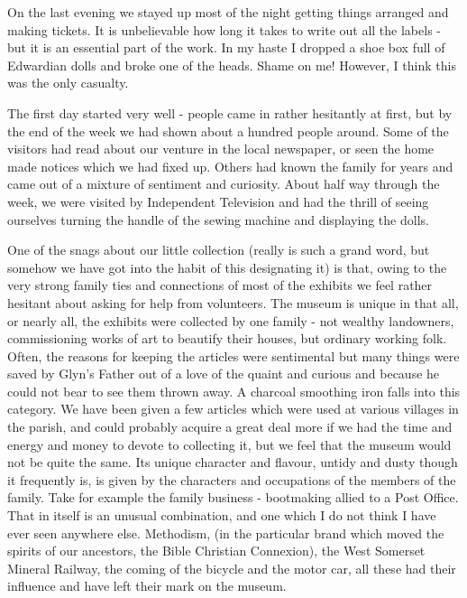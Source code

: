 On the last evening we stayed up most of the night getting things arranged and making tickets. It is unbelievable how long it takes to write out all the labels - but it is an essential part of the work. In my haste I dropped a shoe box full of Edwardian dolls and broke one of the heads. Shame on me! However, I think this was the only casualty.

The first day started very well - people came in rather hesitantly at first, but by the end of the week we had shown about a hundred people around. Some of the visitors had read about our venture in the local newspaper, or seen the home made notices which we had fixed up. Others had known the family for years and came out of a mixture of sentiment and curiosity. About half way through the week, we were visited by Independent Television and had the thrill of seeing ourselves turning the handle of the sewing machine and displaying the dolls.

One of the snags about our little collection (really  is such a grand word, but somehow we have got into the habit of this designating it) is that, owing to the very strong family ties and connections of most of the exhibits we feel rather hesitant about asking for help from volunteers. The museum is unique in that all, or nearly all, the exhibits were collected by one family - not wealthy landowners, commissioning works of art to beautify their houses, but ordinary working folk. Often, the reasons for keeping the articles were sentimental but many things were saved by Glyn's Father out of a love of the quaint and curious and because he could not bear to see them thrown away. A charcoal smoothing iron falls into this category. We have been given a few articles which were used at various villages in the parish, and could probably acquire a great deal more if we had the time and energy and money to devote to collecting it, but we feel that the museum would not be quite the same. Its unique character and flavour, untidy and dusty though it frequently is, is given by the characters and occupations of the members of the family. Take for example the family business - bootmaking allied to a Post Office. That in itself is an unusual combination, and one which I do not think I have ever seen anywhere else. Methodism, (in the particular brand which moved the spirits of our ancestors, the Bible Christian Connexion), the West Somerset Mineral Railway, the coming of the bicycle and the motor car, all these had their influence and have left their mark on the museum.

